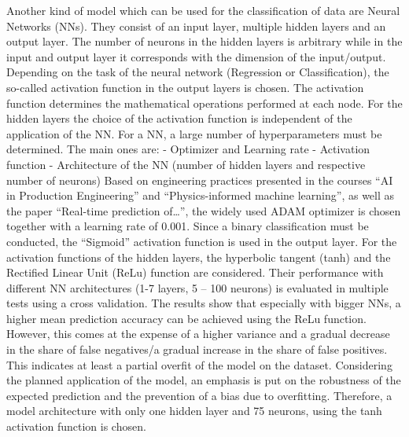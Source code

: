 \documentclass[12pt]{report}
\begin{document}
Another kind of model which can be used for the classification of data are Neural Networks (NNs). They consist of an input layer, multiple hidden layers and an output layer. The number of neurons in the hidden layers is arbitrary while in the input and output layer it corresponds with the dimension of the input/output. Depending on the task of the neural network (Regression or Classification), the so-called activation function in the output layers is chosen. The activation function determines the mathematical operations performed at each node. For the hidden layers the choice of the activation function is independent of the application of the NN.
For a NN, a large number of hyperparameters must be determined. The main ones are:\newline\newline
-	Optimizer and Learning rate\newline\newline
-	Activation function\newline
-	Architecture of the NN (number of hidden layers and respective number of neurons)\newline
Based on engineering practices presented in the courses “AI in Production Engineering” and “Physics-informed machine learning”, as well as the paper “Real-time prediction of…”, the widely used ADAM optimizer is chosen together with a learning rate of 0.001. 
Since a binary classification must be conducted, the “Sigmoid” activation function is used in the output layer.
For the activation functions of the hidden layers, the hyperbolic tangent (tanh) and the Rectified Linear Unit (ReLu) function are considered. Their performance with different NN architectures (1-7 layers, 5 – 100 neurons) is evaluated in multiple tests using a cross validation. The results show that especially with bigger NNs, a higher mean prediction accuracy can be achieved using the ReLu function. However, this comes at the expense of a higher variance and a gradual decrease in the share of false negatives/a gradual increase in the share of false positives. This indicates at least a partial overfit of the model on the dataset. Considering the planned application of the model, an emphasis is put on the robustness of the expected prediction and the prevention of a bias due to overfitting. Therefore, a model architecture with only one hidden layer and 75 neurons, using the tanh activation function is chosen.  
\end{document}
